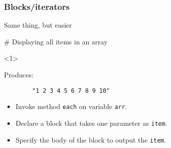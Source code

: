 \documentclass{beamer}
\begin{document}
\begin{frame}[t,fragile]
  \frametitle{Blocks/iterators}
  \begin{block}{Same thing, but easier}
    \begin{semiverbatim}
      \# Displaying all items in an array
    \end{semiverbatim}
  \end{block}
  \begin{onlyenv}<1>
    \begin{block}{Produces:}
      \begin{verbatim}
        "1 2 3 4 5 6 7 8 9 10"
      \end{verbatim}
    \end{block}
  \end{onlyenv}

  \begin{itemize}
    \item<2> Invoke method \texttt{each} on variable \texttt{arr}.
    \item<3> Declare a block that takes one parameter as \texttt{item}.
    \item<4> Specify the body of the block to output the \texttt{item}.
  \end{itemize}
\end{frame}
\end{document}
